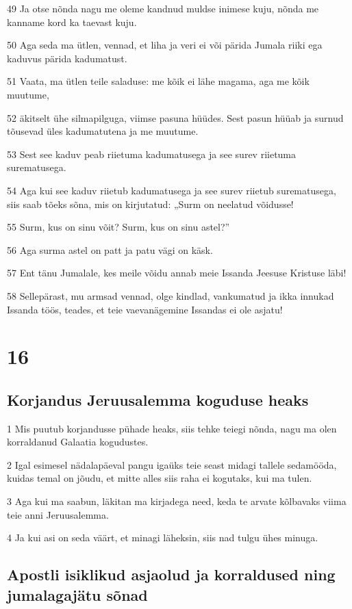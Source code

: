 \par 49 Ja otse nõnda nagu me oleme kandnud muldse inimese kuju, nõnda me kanname kord ka taevast kuju.
\par 50 Aga seda ma ütlen, vennad, et liha ja veri ei või pärida Jumala riiki ega kaduvus pärida kadumatust.
\par 51 Vaata, ma ütlen teile saladuse: me kõik ei lähe magama, aga me kõik muutume,
\par 52 äkitselt ühe silmapilguga, viimse pasuna hüüdes. Sest pasun hüüab ja surnud tõusevad üles kadumatutena ja me muutume.
\par 53 Sest see kaduv peab riietuma kadumatusega ja see surev riietuma surematusega.
\par 54 Aga kui see kaduv riietub kadumatusega ja see surev riietub surematusega, siis saab tõeks sõna, mis on kirjutatud: „Surm on neelatud võidusse!
\par 55 Surm, kus on sinu võit? Surm, kus on sinu astel?”
\par 56 Aga surma astel on patt ja patu vägi on käsk.
\par 57 Ent tänu Jumalale, kes meile võidu annab meie Issanda Jeesuse Kristuse läbi!
\par 58 Sellepärast, mu armsad vennad, olge kindlad, vankumatud ja ikka innukad Issanda töös, teades, et teie vaevanägemine Issandas ei ole asjatu!


\chapter{16}

\section*{Korjandus Jeruusalemma koguduse heaks}

\par 1 Mis puutub korjandusse pühade heaks, siis tehke teiegi nõnda, nagu ma olen korraldanud Galaatia kogudustes.
\par 2 Igal esimesel nädalapäeval pangu igaüks teie seast midagi tallele sedamööda, kuidas temal on jõudu, et mitte alles siis raha ei kogutaks, kui ma tulen.
\par 3 Aga kui ma saabun, läkitan ma kirjadega need, keda te arvate kõlbavaks viima teie anni Jeruusalemma.
\par 4 Ja kui asi on seda väärt, et minagi läheksin, siis nad tulgu ühes minuga.

\section*{Apostli isiklikud asjaolud ja korraldused ning jumalagajätu sõnad}

